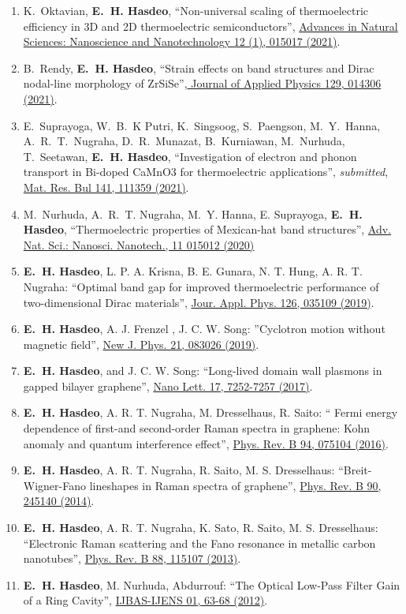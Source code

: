 \documentclass[a4paper,11pt]{article}
\def\hes{{\bf E.~H. Hasdeo}}
\def\sub{\emph{submitted}}
\begin{document}
\begin{enumerate}
  \item K.~Oktavian, \hes, ``Non-universal scaling of thermoelectric efficiency in 3D and 2D thermoelectric semiconductors'', \href{https://iopscience.iop.org/article/10.1088/2043-6262/abe93c/meta}{Advances in Natural Sciences: Nanoscience and Nanotechnology 12 (1), 015017 (2021)}.
\item B.~Rendy, \hes, ``Strain effects on band structures and Dirac nodal-line morphology of ZrSiSe'',\href{https://pubs.aip.org/aip/jap/article/129/1/014306/1065328}{ Journal of Applied Physics 129, 014306 (2021)}.
\item E.~Suprayoga, W.~B.~K Putri, K.~Singsoog, S.~Paengson, M.~Y.~Hanna, A.~R.~T.~Nugraha, D.~R.~Munazat, B.~Kurniawan, M.~Nurhuda, T.~Seetawan, \hes, ``Investigation of electron and phonon transport in Bi-doped CaMnO3 for thermoelectric applications'', \sub, \href{https://doi.org/10.1016/j.materresbull.2021.111359}{Mat. Res. Bul 141, 111359 (2021)}.
\item M.~Nurhuda, A.~R.~T. Nugraha, M.~Y. Hanna, E. Suprayoga, \hes, ``Thermoelectric properties of Mexican-hat band structures'', \href{https://doi.org/10.1088/2043-6254/ab7225}{Adv. Nat. Sci.: Nanosci. Nanotech., 11  015012 (2020)}
\item \hes, L. P. A. Krisna, B. E. Gunara, N. T. Hung, A. R. T. Nugraha: ``Optimal band gap for improved thermoelectric performance of two-dimensional Dirac materials'', \href{https://doi.org/10.1063/1.5100985}{Jour. Appl. Phys. 126, 035109 (2019)}.
\item \hes, A. J. Frenzel , J. C. W. Song: ''Cyclotron motion without magnetic field'',  \href{https://doi.org/10.1088/1367-2630/ab351c} {New J. Phys. 21, 083026 (2019)}.
  \item \hes,  and J. C. W. Song: ``Long-lived domain wall plasmons in gapped bilayer graphene'', \href{http://dx.doi.org/10.1021/acs.nanolett.7b02584}{Nano Lett. 17, 7252-7257 (2017)}.
\item \hes, A. R. T. Nugraha, M. Dresselhaus, R. Saito: `` Fermi
  energy dependence of first-and second-order Raman spectra in
  graphene: Kohn anomaly and quantum interference effect'',
  \href{http://dx.doi.org/10.1103/PhysRevB.94.075104}{ Phys. Rev. B 94, 075104 (2016)}.
 \item \hes, A. R. T. Nugraha, R. Saito, M. S. Dresselhaus:
    ``Breit-Wigner-Fano lineshapes in Raman spectra of graphene'',
    \href{http://dx.doi.org/10.1103/PhysRevB.90.245140} {Phys. Rev. B
      90, 245140 (2014)}.
    \item \hes,  A. R. T. Nugraha, K. Sato, R. Saito,
  M. S. Dresselhaus: ``Electronic Raman scattering and the Fano
  resonance in metallic carbon nanotubes'',
  \href{http://dx.doi.org/10.1103/PhysRevB.88.115107}{
      Phys. Rev. B 88, 115107 (2013)}.
\item \hes, M. Nurhuda, Abdurrouf: ``The Optical Low-Pass Filter Gain
  of a Ring Cavity'',
  \href{http://www.ijens.org/Vol_12_I_01/125701-9494-IJBAS-IJENS.pdf}
  {IJBAS-IJENS  01, 63-68 (2012)}.
\end{enumerate}
\end{document}
